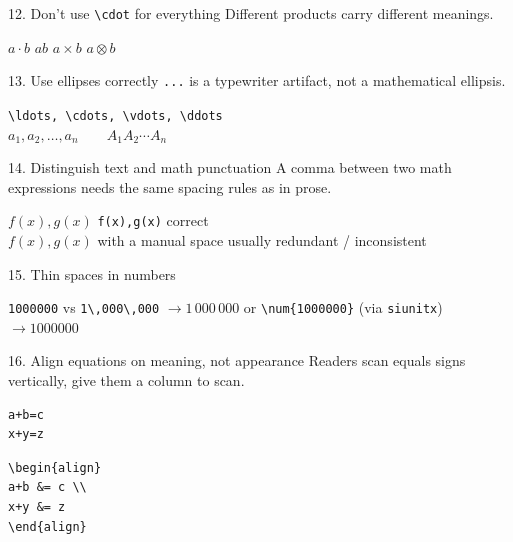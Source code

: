 \documentclass[11pt]{article}
\begin{document}
\begin{tipbox}{12. Don't use \texttt{\textbackslash cdot} for everything}
Different products carry different meanings.
\end{tipbox}
\begin{center}
$a\cdot b$ \quad $ab$ \quad $a\times b$ \quad $a\otimes b$
\end{center}

\begin{tipbox}{13. Use ellipses correctly}
\texttt{...} is a typewriter artifact, not a mathematical ellipsis.
\end{tipbox}
\begin{center}
\texttt{\textbackslash ldots, \textbackslash cdots, \textbackslash vdots, \textbackslash ddots}\\[4pt]
$a_1,a_2,\ldots,a_n \qquad A_1A_2\cdots A_n$
\end{center}

\begin{tipbox}{14. Distinguish text and math punctuation}
A comma between two math expressions needs the same spacing rules as
in prose.
\end{tipbox}
\begin{center}
$f(x),g(x)$ \quad\texttt{f(x),g(x)} \hfill correct\\
$f(x), g(x)$ \quad with a manual space \hfill usually redundant / inconsistent
\end{center}

\begin{tipbox}{15. Thin spaces in numbers}
\end{tipbox}
\begin{center}
\texttt{1000000} \hfill vs \hfill \texttt{1\textbackslash,000\textbackslash,000} $\to 1\,000\,000$
\quad or \quad \verb|\num{1000000}| (via \texttt{siunitx}) $\to \num{1000000}$
\end{center}

\begin{tipbox}{16. Align equations on meaning, not appearance}
Readers scan equals signs vertically, give them a column to scan.
\end{tipbox}
\begin{minipage}[t]{0.46\textwidth}
\begin{badcode}
\begin{verbatim}
a+b=c
x+y=z
\end{verbatim}
\end{badcode}
\end{minipage}\hfill
\begin{minipage}[t]{0.5\textwidth}
\begin{goodcode}
\begin{verbatim}
\begin{align}
a+b &= c \\
x+y &= z
\end{align}
\end{verbatim}
\end{goodcode}
\end{minipage}
\end{document}
